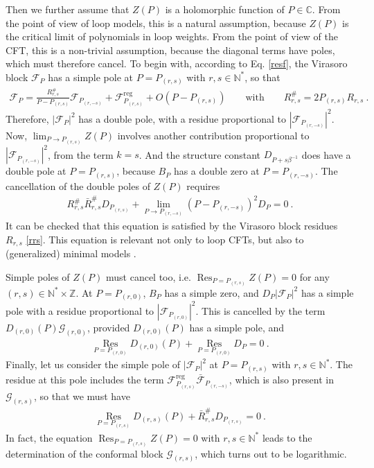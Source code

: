 \documentclass[12pt, a4paper]{article}
\begin{document}
Then we further assume that $Z(P)$ is a holomorphic function of $P\in\mathbb{C}$. From the point of view of loop models, this is a natural assumption, because $Z(P)$ is the critical limit of polynomials in loop weights. From the point of view of the CFT, this is a non-trivial assumption, because the diagonal terms have poles, which must therefore cancel. 
To begin with, according to Eq. \eqref{resf}, the Virasoro block $\mathcal{F}_P$ has a simple pole at $P=P_{(r,s)}$ with $r,s\in \mathbb{N}^*$, so that 
\begin{align}
 \mathcal{F}_P = \frac{R^{\#}_{r,s}}{P-P_{(r,s)}} \mathcal{F}_{P_{(r,-s)}} + \mathcal{F}^\text{reg}_{P_{(r,s)}} + O(P-P_{(r,s)}) \qquad \text{with} \qquad R^{\#}_{r,s} = 2P_{(r,s)}R_{r,s}\ .
 \label{freg}
\end{align}
Therefore, $\left|\mathcal{F}_P\right|^2$ has a double pole, with a residue proportional to $\left|\mathcal{F}_{P_{(r,-s)}}\right|^2$. Now, $\lim_{P\to P_{(r,s)}} Z(P)$ involves another contribution proportional to $\left|\mathcal{F}_{P_{(r,-s)}}\right|^2$, from the term $k=s$. And the structure constant $D_{P+s\beta^{-1}}$ does have a double pole at $P=P_{(r,s)}$, because $B_P$ has a double zero at $P=P_{(r,-s)}$. The cancellation of the double poles of $Z(P)$ requires 
\begin{align}
 R^{\#}_{r,s}\bar{R}^{\#}_{r,s}D_{P_{(r,s)}} + \lim_{P\to P_{(r,-s)}}\left(P-P_{(r,-s)}\right)^2 D_P = 0 \ .
 \label{dpld}
\end{align}
It can be checked that this equation is satisfied by the Virasoro block residues $R_{r,s}$ \eqref{rrs}. This equation is relevant not only to loop CFTs, but also to (generalized) minimal models \cite{rib18}.

Simple poles of $Z(P)$ must cancel too, i.e. $\operatorname{Res}_{P=P_{(r,s)}}Z(P)=0$ for any $(r,s)\in \mathbb{N}^*\times\mathbb{Z}$. At $P=P_{(r,0)}$, $B_P$ has a simple zero, and $D_P\left|\mathcal{F}_P\right|^2$ has a simple pole with a residue proportional to $\left|\mathcal{F}_{P_{(r,0)}}\right|^2$. This is  cancelled by the term $D_{(r,0)}(P) \mathcal{G}_{(r,0)}$, provided $D_{(r,0)}(P)$ has a simple pole, and 
\begin{align}
  \underset{P=P_{(r,0)}}{\operatorname{Res}} D_{(r,0)}(P) + \underset{P=P_{(r,0)}}{\operatorname{Res}}D_P = 0 \ .
\end{align}
Finally, let us consider the simple pole of $\left|\mathcal{F}_{P}\right|^2$ at $P=P_{(r,s)}$ with $r,s\in \mathbb{N}^*$. The residue at this pole includes the term 
$\mathcal{F}_{P_{(r,s)}}^\text{reg}\bar{\mathcal{F}}_{P_{(r,-s)}}$, which is also present in $\mathcal{G}_{(r,s)}$, so that we must have 
\begin{align}
 \underset{P=P_{(r,s)}}{\operatorname{Res}} D_{(r,s)}(P) + \bar R^{\#}_{r,s} D_{P_{(r,s)}} = 0\ .
 \label{rdp}
\end{align}
In fact, the equation $\operatorname{Res}_{P=P_{(r,s)}}Z(P)=0$ with $r,s\in \mathbb{N}^*$ leads to the determination of the conformal block $\mathcal{G}_{(r,s)}$, which turns out to be logarithmic. 
\end{document}

